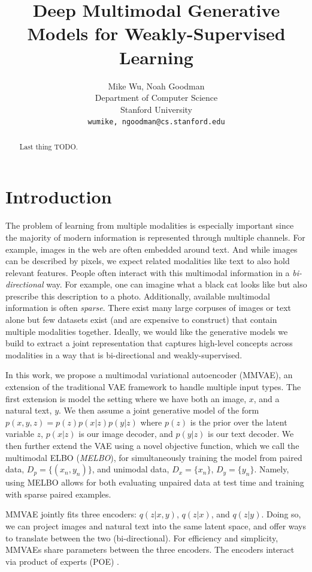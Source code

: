 \documentclass{article}
\title{Deep Multimodal Generative Models for Weakly-Supervised Learning}
\author{
    Mike Wu, Noah Goodman \\
    Department of Computer Science \\
    Stanford University \\
    \texttt{{wumike, ngoodman}@cs.stanford.edu} \\
}
\begin{document}
\maketitle

\begin{abstract}
Last thing TODO.
\end{abstract}

\section{Introduction}
The problem of learning from multiple modalities is especially important since the majority of modern information is represented through multiple channels. For example, images in the web are often embedded around text. And while images can be described by pixels, we expect related modalities like text to also hold relevant features. People often interact with this multimodal information in a \textit{bi-directional} way. For example, one can imagine what a black cat looks like but also prescribe this description to a photo. Additionally, available multimodal information is often \textit{sparse}. There exist many large corpuses of images or text alone but few datasets exist (and are expensive to construct) that contain multiple modalities together. Ideally, we would like the generative models we build to extract a joint representation that captures high-level concepts across modalities in a way that is bi-directional and weakly-supervised. 

In this work, we propose a multimodal variational autoencoder (MMVAE), an extension of the traditional VAE framework to handle multiple input types. The first extension is model the setting where we have both an image, $x$, and a natural text, $y$. We then assume a joint generative model of the form $p(x, y, z) = p(z)p(x | z)p(y | z)$ where $p(z)$ is the prior over the latent variable $z$, $p(x | z)$ is our image decoder, and $p(y | z)$ is our text decoder. We then further extend the VAE using a novel objective function, which we call the multimodal ELBO (\textit{MELBO}), for simultaneously training the model from paired data, $D_{p} = \{ (x_{n}, y_{n}) \}$, and unimodal data, $D_{x} = \{ x_{n} \}$, $D_{y} = \{ y_{n} \}$. Namely, using MELBO allows for both evaluating unpaired data at test time and training with sparse paired examples. 

MMVAE jointly fits three encoders: $q(z | x, y)$, $q(z | x)$, and $q(z | y)$. Doing so, we can project images and natural text into the same latent space, and offer ways to translate between the two (bi-directional). For efficiency and simplicity, MMVAEs share parameters between the three encoders. The encoders interact via product of experts (POE) \cite{hinton2006training, vedantam2017generative}. 
\end{document}
